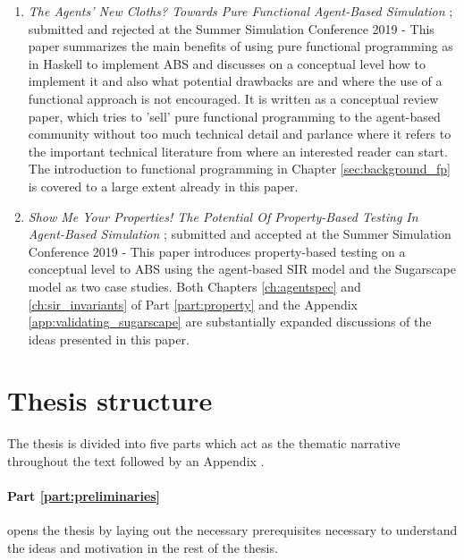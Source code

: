 \begin{enumerate}
	\item \textit{The Agents' New Cloths? Towards Pure Functional Agent-Based Simulation} \cite{thaler_agents_2019}; submitted and rejected at the Summer Simulation Conference 2019 - This paper summarizes the main benefits of using pure functional programming as in Haskell to implement ABS and discusses on a conceptual level how to implement it and also what potential drawbacks are and where the use of a functional approach is not encouraged. It is written as a conceptual review paper, which tries to 'sell' pure functional programming to the agent-based community without too much technical detail and parlance where it refers to the important technical literature from where an interested reader can start. The introduction to functional programming in Chapter \ref{sec:background_fp} is covered to a large extent already in this paper.
	
	\item \textit{Show Me Your Properties! The Potential Of Property-Based Testing In Agent-Based Simulation} \cite{thaler_show_2019}; submitted and accepted at the Summer Simulation Conference 2019 - This paper introduces property-based testing on a conceptual level to ABS using the agent-based SIR model and the Sugarscape model as two case studies. Both Chapters \ref{ch:agentspec} and \ref{ch:sir_invariants} of Part \ref{part:property} and the Appendix \ref{app:validating_sugarscape} are substantially expanded discussions of the ideas presented in this paper.
\end{enumerate}


\section{Thesis structure}

The thesis is divided into five parts which act as the thematic narrative throughout the text followed by an Appendix . 

\paragraph{Part \ref{part:preliminaries}} opens the thesis by laying out the necessary prerequisites necessary to understand the ideas and motivation in the rest of the thesis.
\medskip

